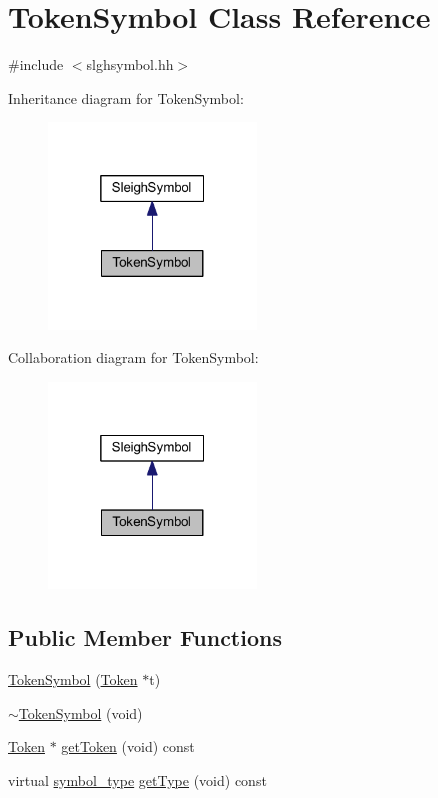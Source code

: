 \hypertarget{class_token_symbol}{}\section{Token\+Symbol Class Reference}
\label{class_token_symbol}


{\ttfamily \#include $<$slghsymbol.\+hh$>$}



Inheritance diagram for Token\+Symbol\+:
\nopagebreak
\begin{figure}[H]
\begin{center}
\leavevmode
\includegraphics[width=157pt]{class_token_symbol__inherit__graph}
\end{center}
\end{figure}


Collaboration diagram for Token\+Symbol\+:
\nopagebreak
\begin{figure}[H]
\begin{center}
\leavevmode
\includegraphics[width=157pt]{class_token_symbol__coll__graph}
\end{center}
\end{figure}
\subsection*{Public Member Functions}
\begin{DoxyCompactItemize}
\item 
\mbox{\hyperlink{class_token_symbol_ad42d6513d25f353332060fa5443418fe}{Token\+Symbol}} (\mbox{\hyperlink{class_token}{Token}} $\ast$t)
\item 
\mbox{\hyperlink{class_token_symbol_a6102524fb0f6d6e7583fc9d00c431634}{$\sim$\+Token\+Symbol}} (void)
\item 
\mbox{\hyperlink{class_token}{Token}} $\ast$ \mbox{\hyperlink{class_token_symbol_a96232eae72d636321693f8294b7b9439}{get\+Token}} (void) const
\item 
virtual \mbox{\hyperlink{class_sleigh_symbol_aba70f7f332fd63488c5ec4bd7807db41}{symbol\+\_\+type}} \mbox{\hyperlink{class_token_symbol_a7e8a40307182bedd22dc453c95544247}{get\+Type}} (void) const
\end{DoxyCompactItemize}
